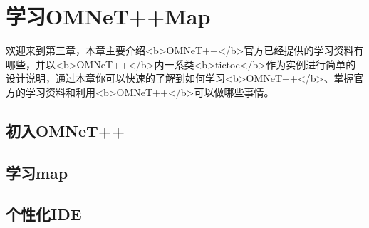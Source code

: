 \chapter{学习OMNeT++Map}

\begin{summary}
欢迎来到第三章，本章主要介绍<b>OMNeT++</b>官方已经提供的学习资料有哪些，并以<b>OMNeT++</b>内一系类<b>tictoc</b>作为实例进行简单的设计说明，通过本章你可以快速的了解到如何学习<b>OMNeT++</b>、掌握官方的学习资料和利用<b>OMNeT++</b>可以做哪些事情。\\
\end{summary}

\section{初入OMNeT++}


\section{学习map}


\section{个性化IDE}



